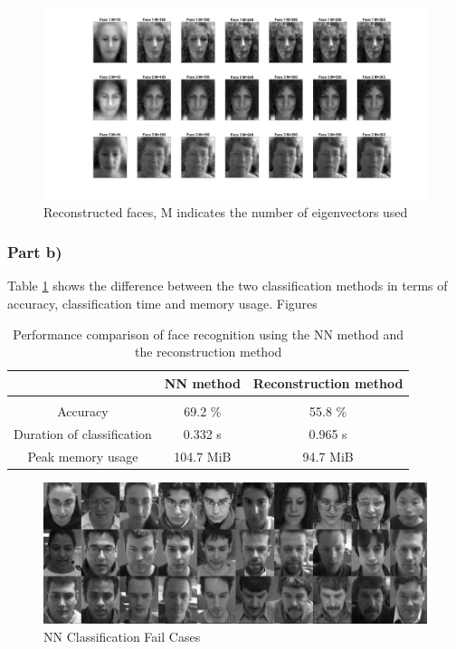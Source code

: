 \documentclass[10pt,technote]{IEEEtran}
\begin{document}
\begin{figure}[htb!]
    \centering
    \includegraphics[width=\linewidth]{../results/ex1aa/face_plots.png}
    \caption{Reconstructed faces, M indicates the number of eigenvectors used}
    \label{fig:reconstr_faces}
\end{figure}


\subsubsection{Part b)}
Table \ref{tab:NNvsRec} shows the difference between the two classification methods in terms of accuracy, classification time and memory usage.
Figures 

\begin{table}[]
    \centering
    \begin{tabular}{c||c c}
         & NN method & Reconstruction method  \\\hline \hline\\
         Accuracy &  69.2 \% & 55.8 \% \\
         Duration of classification & 0.332 s & 0.965 s \\
         Peak memory usage & 104.7 MiB & 94.7 MiB
         
    \end{tabular}
    \caption{Performance comparison of face recognition using the NN method and the reconstruction method}
    \label{tab:NNvsRec}
\end{table}

\begin{figure}[htb!]
    \centering
    \includegraphics[width=\linewidth]{../results/1bb/NN_FAIL2_cropped.png}
    \caption{NN Classification Fail Cases}
    \label{fig:nn_fails}
\end{figure}
\end{document}
